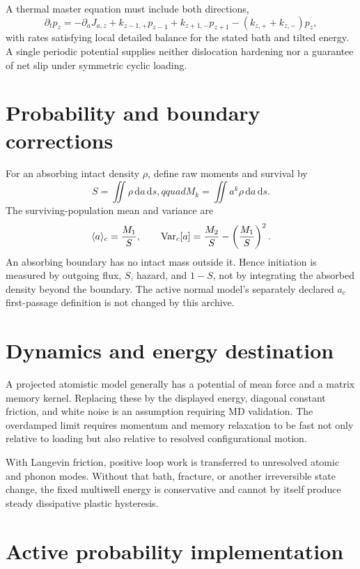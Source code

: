 \documentclass[11pt]{article}
\newcommand{\dd}{\,\mathrm d}
\begin{document}
A thermal master equation must include both directions,
\begin{equation}
\partial_tp_z=-\partial_aJ_{a,z}
+k_{z-1,+}p_{z-1}+k_{z+1,-}p_{z+1}
-(k_{z,+}+k_{z,-})p_z,
\end{equation}
with rates satisfying local detailed balance for the stated bath and tilted
energy. A single periodic potential supplies neither dislocation hardening nor
a guarantee of net slip under symmetric cyclic loading.

\section{Probability and boundary corrections}

For an absorbing intact density $\rho$, define raw moments and survival by
\begin{equation}
S=\iint\rho\dd a\dd s,qquad M_k=\iint a^k\rho\dd a\dd s.
\end{equation}
The surviving-population mean and variance are
\begin{equation}
\langle a\rangle_c={M_1\over S},
\qquad \operatorname{Var}_c[a]={M_2\over S}-\left({M_1\over S}\right)^2.
\end{equation}
An absorbing boundary has no intact mass outside it. Hence initiation is
measured by outgoing flux, $S$, hazard, and $1-S$, not by integrating the
absorbed density beyond the boundary. The active normal model's separately
declared $a_c$ first-passage definition is not changed by this archive.

\section{Dynamics and energy destination}

A projected atomistic model generally has a potential of mean force and a
matrix memory kernel. Replacing these by the displayed energy, diagonal
constant friction, and white noise is an assumption requiring MD validation.
The overdamped limit requires momentum and memory relaxation to be fast not
only relative to loading but also relative to resolved configurational motion.

With Langevin friction, positive loop work is transferred to unresolved
atomic and phonon modes. Without that bath, fracture, or another irreversible
state change, the fixed multiwell energy is conservative and cannot by itself
produce steady dissipative plastic hysteresis.

\section{Active probability implementation}
\end{document}
